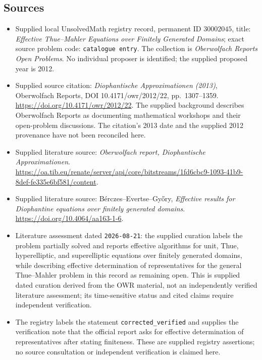 \documentclass[11pt]{article}
\begin{document}
\subsection{Sources}
\begin{itemize}
\item Supplied local UnsolvedMath registry record, permanent ID \(30002045\), title: \emph{Effective Thue--Mahler Equations over Finitely Generated Domains}; exact source problem code: \texttt{catalogue entry}. The collection is \emph{Oberwolfach Reports Open Problems}. No individual proposer is identified; the supplied proposed year is 2012.
\item Supplied source citation: \emph{Diophantische Approximationen (2013)}, Oberwolfach Reports, DOI 10.4171/owr/2012/22, pp.~1307--1359. \url{https://doi.org/10.4171/owr/2012/22}. The supplied background describes Oberwolfach Reports as documenting mathematical workshops and their open-problem discussions. The citation's 2013 date and the supplied 2012 provenance have not been reconciled here.
\item Supplied literature source: \emph{Oberwolfach report, Diophantische Approximationen}. \url{https://oa.tib.eu/renate/server/api/core/bitstreams/1fd6cbc9-1093-41b9-8def-fe335e6bf581/content}.
\item Supplied literature source: B\'erczes--Evertse--Gy\H{o}ry, \emph{Effective results for Diophantine equations over finitely generated domains}. \url{https://doi.org/10.4064/aa163-1-6}.
\item Literature assessment dated \texttt{2026-08-21}: the supplied curation labels the problem partially solved and reports effective algorithms for unit, Thue, hyperelliptic, and superelliptic equations over finitely generated domains, while describing effective determination of representatives for the general Thue--Mahler problem in this record as remaining open. This is supplied dated curation derived from the OWR material, not an independently verified literature assessment; its time-sensitive status and cited claims require independent verification.
\item The registry labels the statement \texttt{corrected\_verified} and supplies the verification note that the official report asks for effective determination of representatives after stating finiteness. These are supplied registry assertions; no source consultation or independent verification is claimed here.
\end{itemize}
\end{document}
